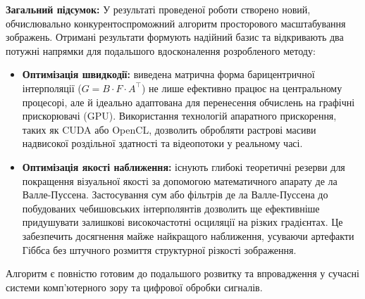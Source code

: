 \textbf{Загальний підсумок:} У результаті проведеної роботи створено новий, обчислювально конкурентоспроможний алгоритм просторового масштабування зображень. 
Отримані результати формують надійний базис та відкривають два потужні напрямки для подальшого вдосконалення розробленого методу:
\begin{itemize}
	\item \textbf{Оптимізація швидкодії:} виведена матрична форма барицентричної інтерполяції ($G = B \cdot F \cdot A^\top$) не лише ефективно працює на центральному процесорі, але й ідеально адаптована для перенесення обчислень на графічні прискорювачі (GPU). Використання технологій апаратного прискорення, таких як CUDA або OpenCL, дозволить обробляти растрові масиви надвисокої роздільної здатності та відеопотоки у реальному часі.
	\item \textbf{Оптимізація якості наближення:} існують глибокі теоретичні резерви для покращення візуальної якості за допомогою математичного апарату де ла Валле-Пуссена. Застосування сум або фільтрів де ла Валле-Пуссена до побудованих чебишовських інтерполянтів дозволить ще ефективніше придушувати залишкові високочастотні осциляції на різких градієнтах. Це забезпечить досягнення майже найкращого наближення, усуваючи артефакти Гіббса без штучного розмиття структурної різкості зображення.
\end{itemize}

Алгоритм є повністю готовим до подальшого розвитку та впровадження у сучасні системи комп'ютерного зору та цифрової обробки сигналів.